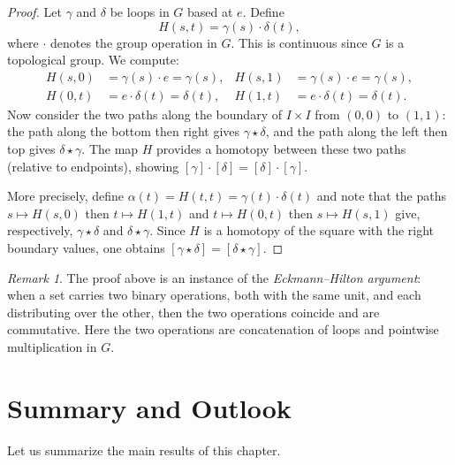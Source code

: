 \documentclass[12pt,a4paper,openany]{book}
\theoremstyle{definition}
\theoremstyle{plain}
\theoremstyle{remark}
\newtheorem{remark}[definition]{Remark}
\begin{document}
\begin{proof}
Let $\gamma$ and $\delta$ be loops in $G$ based at $e$. Define
\[
  H(s, t) = \gamma(s) \cdot \delta(t),
\]
where $\cdot$ denotes the group operation in $G$. This is continuous since $G$ is
a topological group. We compute:
\begin{align*}
  H(s, 0) &= \gamma(s) \cdot e = \gamma(s), & H(s, 1) &= \gamma(s) \cdot e = \gamma(s), \\
  H(0, t) &= e \cdot \delta(t) = \delta(t), & H(1, t) &= e \cdot \delta(t) = \delta(t).
\end{align*}
Now consider the two paths along the boundary of $I \times I$ from $(0,0)$ to
$(1,1)$: the path along the bottom then right gives $\gamma \star \delta$, and
the path along the left then top gives $\delta \star \gamma$. The map $H$
provides a homotopy between these two paths (relative to endpoints), showing
$[\gamma] \cdot [\delta] = [\delta] \cdot [\gamma]$.

More precisely, define $\alpha(t) = H(t, t) = \gamma(t) \cdot \delta(t)$ and note
that the paths $s \mapsto H(s, 0)$ then $t \mapsto H(1, t)$ and $t \mapsto H(0,
t)$ then $s \mapsto H(s, 1)$ give, respectively, $\gamma \star \delta$ and
$\delta \star \gamma$. Since $H$ is a homotopy of the square with the right
boundary values, one obtains $[\gamma \star \delta] = [\delta \star \gamma]$.
\end{proof}

\begin{remark}\label{rem:eckmann-hilton}
The proof above is an instance of the \emph{Eckmann--Hilton
argument}: when a set carries two binary
operations, both with the same unit, and each distributing over the other, then
the two operations coincide and are commutative. Here the two operations are
concatenation of loops and pointwise multiplication in $G$.
\end{remark}


\section{Summary and Outlook}\label{sec:ch2-summary}

Let us summarize the main results of this chapter.
\end{document}
